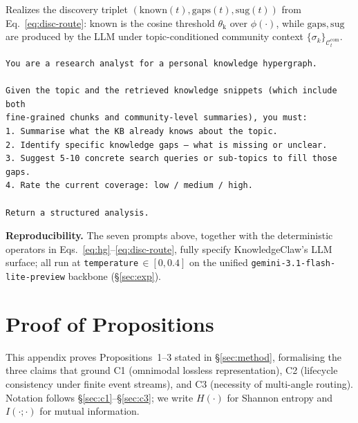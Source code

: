 \documentclass{article}
\begin{document}
 Realizes the discovery triplet $(\mathrm{known}(t),\mathrm{gaps}(t),\mathrm{sug}(t))$ from Eq.~\ref{eq:disc-route}: $\mathrm{known}$ is the cosine threshold $\theta_{\mathrm{k}}$ over $\phi(\cdot)$, while $\mathrm{gaps},\mathrm{sug}$ are produced by the LLM under topic-conditioned community context $\{\sigma_k\}_{\mathcal{C}_t^{\mathrm{com}}}$.
\begin{shaded}
\footnotesize
\begin{verbatim}
You are a research analyst for a personal knowledge hypergraph.

Given the topic and the retrieved knowledge snippets (which include both
fine-grained chunks and community-level summaries), you must:
1. Summarise what the KB already knows about the topic.
2. Identify specific knowledge gaps — what is missing or unclear.
3. Suggest 5-10 concrete search queries or sub-topics to fill those gaps.
4. Rate the current coverage: low / medium / high.

Return a structured analysis.
\end{verbatim}
\end{shaded}

\textbf{Reproducibility.} The seven prompts above, together with the deterministic operators in Eqs.~\eqref{eq:hg}--\eqref{eq:disc-route}, fully specify KnowledgeClaw's LLM surface; all run at \texttt{temperature}\,$\in\![0,0.4]$ on the unified \texttt{gemini-3.1-flash-lite-preview} backbone (\S\ref{sec:exp}).

\clearpage

\section{Proof of Propositions}\label{proofs}

This appendix proves Propositions~1--3 stated in \S\ref{sec:method}, formalising the three claims that ground C1 (omnimodal lossless representation), C2 (lifecycle consistency under finite event streams), and C3 (necessity of multi-angle routing). Notation follows \S\ref{sec:c1}--\S\ref{sec:c3}; we write $H(\cdot)$ for Shannon entropy and $I(\cdot;\cdot)$ for mutual information.
\end{document}

